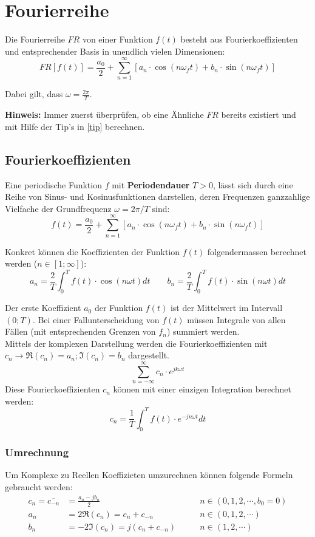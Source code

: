 \section{Fourierreihe}
Die Fourierreihe $FR$ von einer Funktion $f(t)$ besteht aus Fourierkoeffizienten und entsprechender Basis in unendlich vielen Dimensionen:
\[
FR[f(t)] = \frac{a_0}{2} + \sum_{n = 1}^{\infty}[a_n \cdot \cos(n\omega_ft) + b_n \cdot \sin(n\omega_ft)]
\]

\noindent Dabei gilt, dass $\omega = \frac{2\pi}{T}$.

\noindent\textbf{Hinweis:} Immer zuerst überprüfen, ob eine Ähnliche $FR$ bereits existiert und mit Hilfe der Tip's in \ref{tip} berechnen.

\subsection{Fourierkoeffizienten}
Eine periodische Funktion $f$ mit \textbf{Periodendauer} $T > 0$, lässt sich durch eine Reihe von Sinus- und Kosinusfunktionen darstellen, deren Frequenzen ganzzahlige Vielfache der Grundfrequenz $\omega = 2\pi/T$ sind:
\[f(t) = \frac{a_0}{2} + \sum_{n = 1}^{\infty}[a_n \cdot \cos(n\omega_ft) + b_n \cdot \sin(n\omega_ft)]\]

\noindent Konkret können die Koeffizienten der Funktion $f(t)$ folgendermassen berechnet werden ($n \in [1;\infty]$):
\[
a_n = \frac{2}{T}\int_{0}^{T}f(t) \cdot \cos(n\omega t)dt \qquad b_n = \frac{2}{T}\int_{0}^{T}f(t) \cdot \sin(n\omega t)dt
\]

\noindent Der erste Koeffizient $a_0$ der Funktion $f(t)$ ist der Mittelwert im Intervall $(0; T)$. Bei einer Fallunterscheidung von $f(t)$ müssen Integrale von allen Fällen (mit entsprechenden Grenzen von $f_n$) summiert werden.
~\\

\noindent Mittels der komplexen Darstellung werden die Fourierkoeffizienten mit $c_n \rightarrow \Re(c_n) = a_n; \Im(c_n) = b_n$ dargestellt.
\[
\sum_{n=-\infty}^{\infty}c_n \cdot e^{jk\omega t}
\]
Diese Fourierkoeffizienten $c_n$ können mit einer einzigen Integration berechnet werden:
\[
c_n = \frac{1}{T} \int_{0}^{T}f(t)\cdot e^{-jn\omega t} dt
\]

\subsubsection{Umrechnung}\label{umrechnung}
Um Komplexe zu Reellen Koeffizieten umzurechnen können folgende Formeln gebraucht werden:
\begin{align*}
	c_n = \overline{c_{-n}} &= \frac{a_n - jb_n}{2} &\qquad n \in (0,1,2, \cdots, b_0 = 0) \\
	a_n &= 2\Re(c_n) = c_n + c_{-n}  &\qquad n \in (0,1,2, \cdots) \\
	b_n &= -2\Im(c_n) = j(c_n + c_{-n}) &\qquad n \in (1,2, \cdots) \\
\end{align*}


